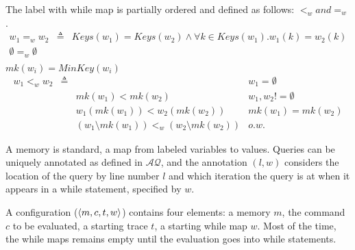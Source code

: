 \documentclass[a4paper,11pt]{article}
\begin{document}
\begin{defn}
The label with while map is partially ordered and defined as follows:
$<_w and =_w$.\\
\[
  \begin{array}{lll}
     w_1 =_w w_2  &  \triangleq &  Keys(w_1) = Keys(w_2) \land \forall k \in Keys(w_1). w_1(k) = w_2(k) \\
     \emptyset =_w \emptyset & &   \\
  \end{array}
\] 
$mk(w_i) =MinKey(w_i) $ 
\[
\begin{array}{llll}
    w_1 <_w w_2 & \triangleq 
     	& & w_1 = \emptyset \\
       	& & mk(w_1) < mk(w_2) & w_1,w_2 != \emptyset  \\
      	& & w_1(mk(w_1)) < w_2(mk(w_2))   & mk(w_1) = mk(w_2) \\
     	& & (w_1 \setminus mk(w_1) ) <_w (w_2 \setminus mk(w_2)) & o.w.
\end{array}
\]
\end{defn}
%

{
A memory is standard, a map from labeled variables to values. 
Queries can be uniquely annotated as defined in $\mathcal{AQ}$, and the annotation $(l,w)$ considers the location of the query by line number $l$ and which iteration the query is at when it appears in a while statement, specified by $w$.
	}

A configuration ($\langle m, c, t,w \rangle$) contains four elements: a memory $m$, the command $c$ to be evaluated, a starting trace $t$, a starting while map $w$. Most of the time, the while maps remains empty until the evaluation goes into while statements.  

%
%
\end{document}
